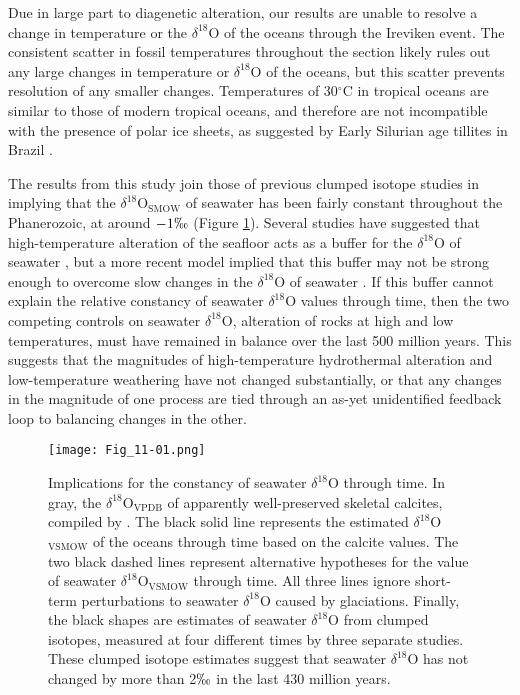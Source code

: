 \documentclass[5p, authoryear]{elsarticle}
\newcommand{\deltao}{$\delta^{18}$}
\newcommand{\degrees}{$^{\circ}$}
\begin{document}
Due in large part to diagenetic alteration, our results are unable to resolve a change in temperature or the \deltao O of the oceans through the Ireviken event. The consistent scatter in fossil temperatures throughout the section likely rules out any large changes in temperature or \deltao O of the oceans, but this scatter prevents resolution of any smaller changes. Temperatures of 30\degrees C in tropical oceans are similar to those of modern tropical oceans, and therefore are not incompatible with the presence of polar ice sheets, as suggested by Early Silurian age tillites in Brazil \citep{Grahn1992}.

The results from this study join those of previous clumped isotope studies in implying that the \deltao O$_{\text{SMOW}}$ of seawater has been fairly constant throughout the Phanerozoic, at around $-1\permil$ (Figure \ref{Veizer}). Several studies have suggested that high-temperature alteration of the seafloor acts as a buffer for the \deltao O of seawater \citep{Muehlenbachs1976,Gregory1981,Gregory1991,Muehlenbachs1998}, but a more recent model implied that this buffer may not be strong enough to overcome slow changes in the \deltao O of seawater \citep{Jaffres2007}. If this buffer cannot explain the relative constancy of seawater \deltao O values through time, then the two competing controls on seawater \deltao O, alteration of rocks at high and low temperatures, must have remained in balance over the last 500 million years. This suggests that the magnitudes of high-temperature hydrothermal alteration and low-temperature weathering have not changed substantially, or that any changes in the magnitude of one process are tied through an as-yet unidentified feedback loop to balancing changes in the other. 

\begin{figure}[h]
\centering
\texttt{[image: Fig\_11-01.png]}
\caption{Implications for the constancy of seawater $\delta^{18}$O through time. In gray, the \deltao O$_{\text{VPDB}}$ of apparently well-preserved skeletal calcites, compiled by \cite{Veizer1999}. The black solid line represents the estimated \deltao O$_{\text{VSMOW}}$ of the oceans through time based on the calcite values. The two black dashed lines represent alternative hypotheses for the value of seawater \deltao O$_{\text{VSMOW}}$ through time. All three lines ignore short-term perturbations  to seawater $\delta^{18}$O caused by glaciations. Finally, the black shapes are estimates of seawater \deltao O from clumped isotopes, measured at four different times by three separate studies. These clumped isotope estimates suggest that seawater \deltao O has not changed by more than 2$\permil$ in the last 430 million years.}
\label{Veizer}
\end{figure}
\end{document}

